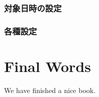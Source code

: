 \documentclass[
]{book}
\begin{document}
\hypertarget{ux5bfeux8c61ux65e5ux6642ux306eux8a2dux5b9a}{%
\subsection{対象日時の設定　　}\label{ux5bfeux8c61ux65e5ux6642ux306eux8a2dux5b9a}}

\hypertarget{ux5404ux7a2eux8a2dux5b9a}{%
\subsection{各種設定}\label{ux5404ux7a2eux8a2dux5b9a}}

\hypertarget{final-words}{%
\chapter{Final Words}\label{final-words}}

We have finished a nice book.

  
\end{document}
